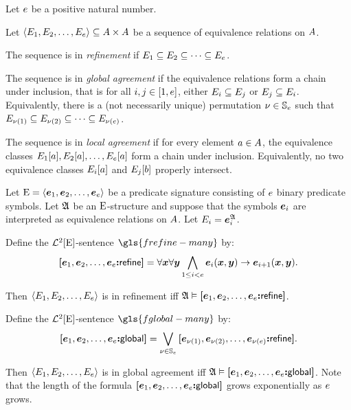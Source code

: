 Let $e$ be a positive natural number.
\begin{definition}
Let $\left\langle E_{1}, E_{2}, \dots, E_{e} \right\rangle \subseteq {A\times A}$ be
a sequence of equivalence relations on $A$.

The sequence is in \emph{refinement} if $E_{1} \subseteq E_{2} \subseteq
\dots \subseteq E_{e}$.

The sequence is in \emph{global agreement} if the equivalence relations form a
chain under inclusion, that is for all $i, j \in [1, e]$,
either $E_{i} \subseteq E_{j}$ or $E_{j} \subseteq E_{i}$.
Equivalently, there is a (not necessarily unique) permutation
$\nu \in \mathbb{S}_{e}$ such that
$E_{\nu(1)} \subseteq E_{\nu(2)} \subseteq \dots \subseteq
E_{\nu(e)}$.

The sequence is in \emph{local agreement} if for every element $a \in A$,
the equivalence classes $E_{1}[a], E_{2}[a], \dots, E_{e}[a]$ form
a chain under inclusion.
Equivalently, no two equivalence classes $E_{i}[a]$ and $E_{j}[b]$
properly intersect.
\end{definition}

Let $\mathrm{E} = \left\langle \bm{e}_{1}, \bm{e}_{2}, \dots, \bm{e}_{e} \right\rangle$ be a predicate signature
consisting of $e$ binary predicate symbols.
Let $\mathfrak{A}$ be an $\mathrm{E}$-structure and suppose that the symbols $\bm{e}_{i}$ are
interpreted as equivalence relations on $A$. Let 
$E_{i} = \bm{e}_{i}^{\mathfrak{A}}$.
\begin{definition}
Define the $\mathcal{L}^{2}[\mathrm{E}]$-sentence $\gls{frefine-many}$ by:
\[
  {\bm{[}\bm{e}_{1},\bm{e}_{2},\dots,\bm{e}_{e}\mathord{\bm{:}}\mathsf{refine}\bm{]}} =
  \forall\bm{x}\forall\bm{y} \bigwedge_{1 \leq i < e}
  \bm{e}_{i}(\bm{x},\bm{y}) \rightarrow \bm{e}_{i+1}(\bm{x},\bm{y}).
\]
\end{definition}
Then $\left\langle E_{1},E_{2},\dots,E_{e} \right\rangle$ is in refinement iff
$\mathfrak{A} \vDash {\bm{[}\bm{e}_{1},\bm{e}_{2},\dots,\bm{e}_{e}\mathord{\bm{:}}\mathsf{refine}\bm{]}}$.

\begin{definition}
Define the $\mathcal{L}^{2}[\mathrm{E}]$-sentence $\gls{fglobal-many}$ by:
\[
  {\bm{[}\bm{e}_{1},\bm{e}_{2},\dots,\bm{e}_{e}\mathord{\bm{:}}\mathsf{global}\bm{]}} =
  \bigvee_{\nu \in \mathbb{S}_{e}}
  {\bm{[}\bm{e}_{\nu(1)},\bm{e}_{\nu(2)},\dots,\bm{e}_{\nu(e)}\mathord{\bm{:}}\mathsf{refine}\bm{]}}.
\]
\end{definition}
Then $\left\langle E_{1},E_{2},\dots,E_{e} \right\rangle$ is in global agreement iff
$\mathfrak{A} \vDash {\bm{[}\bm{e}_{1},\bm{e}_{2},\dots,\bm{e}_{e}\mathord{\bm{:}}\mathsf{global}\bm{]}}$.
Note that the length of the formula ${\bm{[}\bm{e}_{1},\bm{e}_{2},\dots,\bm{e}_{e}\mathord{\bm{:}}\mathsf{global}\bm{]}}$ grows
exponentially as $e$ grows.

